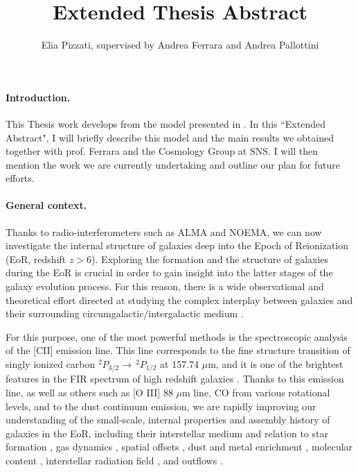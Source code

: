 \documentclass[12pt]{article}
\title{Extended Thesis Abstract}
\author{Elia Pizzati, supervised by Andrea Ferrara and Andrea Pallottini}
\date{\vspace{-8pt}}
\begin{document}
\maketitle


%
%
%
%
%
%



\paragraph{Introduction.}


This Thesis work develops from the model presented in \citet{Pizzati20}. In this ``Extended Abstract", I will briefly describe this model and the main results we obtained together with prof. Ferrara and the Cosmology Group at SNS. I will then mention the work we are currently undertaking and outline our plan for future efforts.

\paragraph{General context.}


Thanks to radio-interferometers such as ALMA and NOEMA, we can now investigate the internal structure of galaxies deep into the Epoch of Reionization (EoR, redshift $z>6$). 
Exploring the formation and the structure of galaxies during the EoR is crucial in order to gain insight into the latter stages of the galaxy evolution process. For this reason, there is a wide observational and theoretical effort directed at studying the complex interplay between galaxies and their surrounding circumgalactic/intergalactic medium \citep[CGM/IGM; for reviews see e.g.][]{Barkana:2000fd,Murali_2002,somerville2015,Dayal:2018hft,Vogelsberger:2019ynw}.

For this purpose, one of the most powerful methods is the spectroscopic analysis of the [CII] emission line. This line corresponds to the fine structure transition of singly ionized carbon $^2P_{3/2} \rightarrow \,^2P_{1/2}$ at 157.74 $\mu$m, and it is one of the brightest features in the FIR spectrum of high redshift galaxies \citep{lefevre:2019}. Thanks to this emission line, as well as others such as [O III] 88 $\mu$m line, CO from various rotational levels, and to the dust continuum emission, we are rapidly improving our understanding of the small-scale, internal properties and assembly history of galaxies in the EoR, including their interstellar medium and relation to star formation \citep{capak2015, carniani2017}, gas dynamics \citep{agertz:2015apj,pallottini2017,Hopkins18}, spatial offsets \citep{inoue2016, Laporte17, carniani2017, carniani2018}, dust and metal enrichment \citep{capak2015, Knudsen:2017, Laporte17, behrens2018, Tamura:2019}, molecular content \citep{dodorico:2018, vallini2018}, interstellar radiation field \citep{Stark15, pallottini:2019}, and outflows \citep{gallerani:2018, ginolfi:2019, herrera2021kiloparsec}.
\end{document}
